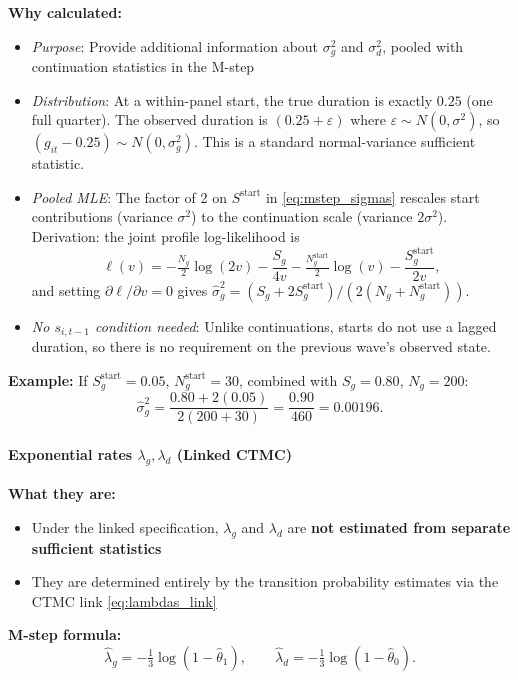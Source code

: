 \documentclass[12pt]{article}
\begin{document}
\textbf{Why calculated:}
\begin{itemize}
\item \emph{Purpose}: Provide additional information about $\sigma_g^2$ and $\sigma_d^2$, pooled with continuation statistics in the M-step
\item \emph{Distribution}: At a within-panel start, the true duration is exactly $0.25$ (one full quarter). The observed duration is $(0.25 + \varepsilon)$ where $\varepsilon \sim N(0,\sigma^2)$, so $(g_{it}-0.25) \sim N(0, \sigma_g^2)$. This is a standard normal-variance sufficient statistic.
\item \emph{Pooled MLE}: The factor of 2 on $S^{\mathrm{start}}$ in \eqref{eq:mstep_sigmas} rescales start contributions (variance $\sigma^2$) to the continuation scale (variance $2\sigma^2$). Derivation: the joint profile log-likelihood is
\[
\ell(v) = -\tfrac{N_g}{2}\log(2v) - \frac{S_g}{4v} - \tfrac{N_g^{\mathrm{start}}}{2}\log(v) - \frac{S_g^{\mathrm{start}}}{2v},
\]
and setting $\partial\ell/\partial v=0$ gives $\hat{\sigma}_g^2 = (S_g + 2S_g^{\mathrm{start}})/(2(N_g + N_g^{\mathrm{start}}))$.
\item \emph{No $s_{i,t-1}$ condition needed}: Unlike continuations, starts do not use a lagged duration, so there is no requirement on the previous wave's observed state.
\end{itemize}

\textbf{Example:}
If $S_g^{\mathrm{start}} = 0.05$, $N_g^{\mathrm{start}} = 30$, combined with $S_g = 0.80$, $N_g = 200$:
\[
\hat{\sigma}_g^2 = \frac{0.80 + 2(0.05)}{2(200+30)} = \frac{0.90}{460} = 0.00196.
\]

\paragraph{Exponential rates $\lambda_g, \lambda_d$ (Linked CTMC)}

\textbf{What they are:}
\begin{itemize}
\item Under the linked specification, $\lambda_g$ and $\lambda_d$ are \textbf{not estimated from separate sufficient statistics}
\item They are determined entirely by the transition probability estimates via the CTMC link \eqref{eq:lambdas_link}
\end{itemize}

\textbf{M-step formula:}
\[
\hat{\lambda}_g = -\tfrac{1}{3}\log(1-\hat{\theta}_1), \qquad \hat{\lambda}_d = -\tfrac{1}{3}\log(1-\hat{\theta}_0).
\]
\end{document}

